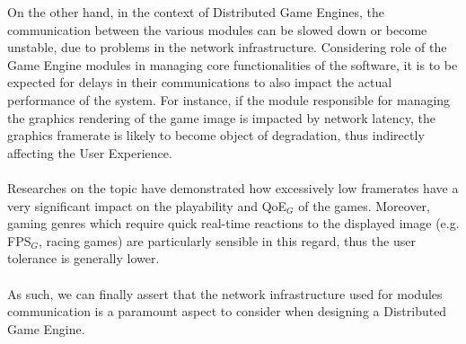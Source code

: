 On the other hand, in the context of Distributed Game Engines, the communication between the various modules can be slowed down or become unstable, due to problems in the network infrastructure. Considering role of the Game Engine modules in managing core functionalities of the software, it is to be expected for delays in their communications to also impact the actual performance of the system. For instance, if the module responsible for managing the graphics rendering of the game image is impacted by network latency, the graphics framerate is likely to become object of degradation, thus indirectly affecting the User Experience. \\ \\
Researches on the topic \cite{womak:framerate-player-FPS} have demonstrated how excessively low framerates have a very significant impact on the playability and QoE$_G$ of the games. Moreover, gaming genres which require quick real-time reactions to the displayed image (e.g. FPS$_G$, racing games) are particularly sensible in this regard, thus the user tolerance is generally lower. \\ \\
As such, we can finally assert that the network infrastructure used for modules communication is a paramount aspect to consider when designing a Distributed Game Engine.

